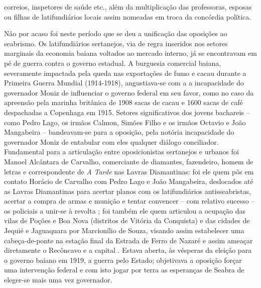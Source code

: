 correios, inspetores de saúde etc., além da multiplicação das professoras, esposas ou filhas de latifundiários locais assim nomeadas em troca da concórdia política.

Nâo por acaso foi neste período que se deu a unificação das oposições ao seabrismo. Os latifundiários sertanejos, via de regra inseridos nos setores marginais da economia baiana voltados ao mercado interno, já se encontravam em pé de guerra contra o governo estadual. A burguesia comercial baiana, severamente impactada pela queda nas exportações de fumo e cacau durante a Primeira Guerra Mundial (1914-1918), angustiava-se com a a incapacidade do governador Moniz de influenciar o governo federal em seu favor, como no caso da apreensão pela marinha britânica de 1908 sacas de cacau e 1600 sacas de café despachadas a Copenhaga em 1915. Setores significativos dos jovens bachareis -- como Pedro Lago, os irmãos Calmon, Simões Filho e os irmãos Octavio e João Mangabeira -- bandeavam-se para a oposição, pela notória incapacidade do governador Moniz de entabular com eles qualquer diálogo conciliador. Fundamental para a articulação entre oposicionistas sertanejos e urbanos foi Manoel Alcântara de Carvalho, comerciante de diamantes, fazendeiro, homem de letras e correspondente de \textit{A Tarde} nas Lavras Diamantinas: foi ele quem pôs em contato Horácio de Carvalho com Pedro Lago e João Mangabeira, deslocados até as Lavras Diamantinas para acertar planos com os latifundiários antisseabristas, acertar a compra de armas e munição e tentar convencer -- com relativo sucesso -- os policiais a unir-se à revolta \cite[p.~201]{CUNHA2011}; foi também ele quem articulou a ocupação das vilas de Poções e Boa Nova (distritos de Vitória da Conquista) e das cidades de Jequié e Jaguaquara por Marcionílio de Souza, visando assim estabelecer uma cabeça-de-ponte na estação final da Estrada de Ferro de Nazaré e assim ameaçar diretamente o Recôncavo e a capital \cite[p.~202]{CUNHA2011}. Estava aberta, às vésperas da eleição para o governo baiano em 1919, a guerra pelo Estado; objetivava a oposição forçar uma intervenção federal e com isto jogar por terra as esperanças de Seabra de eleger-se mais uma vez governador.

